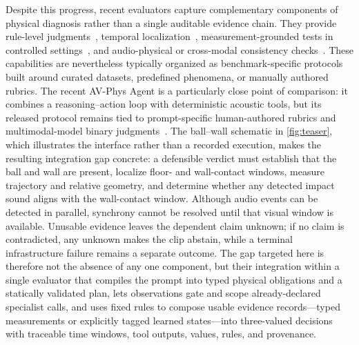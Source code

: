 Despite this progress, recent evaluators capture complementary components of
physical diagnosis rather than a single auditable evidence chain. They provide
rule-level judgments~\cite{videophy2_2025,lin2026phyground}, temporal
localization~\cite{physioneval2026,chinchure2026spotlight}, measurement-grounded
tests in controlled settings~\cite{wang2026gauge}, and audio-physical or
cross-modal consistency checks~\cite{xie2025phyavbench,zhou2026avgenbench}.
These capabilities are nevertheless typically organized as benchmark-specific
protocols built around curated datasets, predefined phenomena, or manually
authored rubrics. The recent AV-Phys Agent is a particularly close point of
comparison: it combines a reasoning--action loop with deterministic acoustic
tools, but its released protocol remains tied to prompt-specific human-authored
rubrics and multimodal-model binary judgments~\cite{cui2026avphys}. The
ball--wall schematic in \cref{fig:teaser}, which illustrates the interface
rather than a recorded execution, makes the resulting integration gap concrete:
a defensible verdict must establish that the ball and wall are present,
localize floor- and wall-contact windows, measure trajectory and relative
geometry, and determine whether any detected impact sound aligns with the
wall-contact window. Although audio events can be detected in parallel,
synchrony cannot be resolved until that visual window is available. Unusable
evidence leaves the dependent claim unknown; if no claim is contradicted, any
unknown makes the clip abstain, while a terminal infrastructure failure
remains a separate outcome. The gap targeted here is therefore not the absence
of any one component, but their integration within a single evaluator that
compiles the prompt into typed physical obligations and a statically validated
plan, lets observations gate and scope already-declared specialist calls, and
uses fixed rules to compose usable evidence records---typed measurements or
explicitly tagged learned states---into three-valued decisions with traceable
time windows, tool outputs, values, rules, and provenance.

